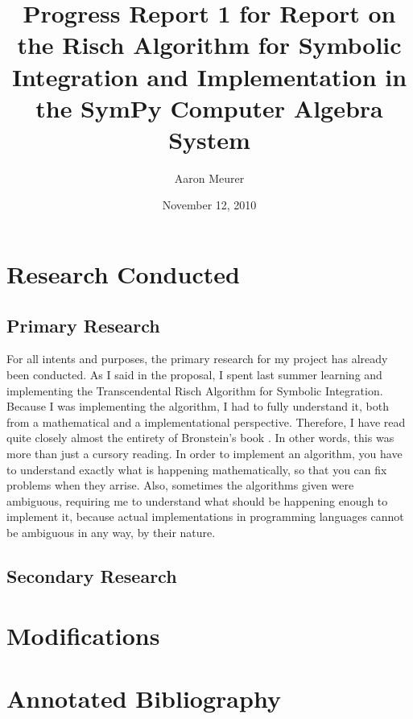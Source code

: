 \documentclass[12pt]{article}
\begin{document}
\title{Progress Report 1 for Report on the Risch Algorithm for Symbolic
Integration and Implementation in the Sym\-Py Computer Algebra System}
\author{Aaron Meurer}
\date{November 12, 2010}
\maketitle


\section{Research Conducted}
\subsection{Primary Research}
For all intents and purposes, the primary research for my project has
already been conducted.  As I said in the proposal, I spent last summer
learning and implementing the Transcendental Risch Algorithm for
Symbolic Integration. Because I was implementing the algorithm, I had to
fully understand it, both from a mathematical and a implementational
perspective.  Therefore, I have read quite closely almost the entirety
of Bronstein's book \cite{bronstein2005symbolic}.  In other words, this was
more than just a cursory reading.  In order to implement an algorithm,
you have to understand exactly what is happening mathematically, so that
you can fix problems when they arrise.  Also, sometimes the algorithms
given were ambiguous, requiring me to understand what should be
happening enough to implement it, because actual implementations in
programming languages cannot be ambiguous in any way, by their nature.

\subsection{Secondary Research}

\section{Modifications}

\section{Annotated Bibliography}

\nocite{*}


\end{document}
